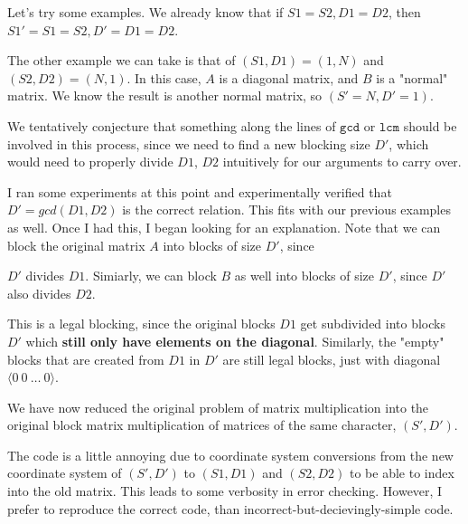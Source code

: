 \documentclass[11pt]{article}
\begin{document}
Let's try some examples. We already know that if $S1 = S2, D1 = D2$, then
$S1' = S1 = S2, D' = D1 = D2$.


The other example we can take is that of $(S1, D1) = (1, N)$ and $(S2, D2) =
(N, 1)$. In this case, $A$ is a diagonal matrix, and $B$ is a "normal" matrix.
We know the result is another normal matrix, so $(S' = N, D' = 1)$.


We tentatively conjecture that something along the lines of $\texttt{gcd}$
or $\texttt{lcm}$ should be involved in this process, since we need to find
a new blocking size $D'$, which would need to properly divide $D1$, $D2$ 
intuitively for our arguments to carry over. 


I ran some experiments at this point and experimentally verified that 
$D' = gcd(D1, D2)$ is the correct relation. This fits with our previous
examples as well. Once I had this, I began looking for an explanation.
Note that we can block the original matrix $A$ into blocks of size $D'$, since

$D'$ divides $D1$.  Simiarly, we can block $B$ as well into blocks of size
$D'$, since $D'$ also divides $D2$.

This is a legal blocking, since the original blocks $D1$ get subdivided into
blocks $D'$ which \textbf{still only have elements on the diagonal}. Similarly,
the "empty" blocks that are created from $D1$ in $D'$ are still legal blocks,
just with diagonal $\langle 0~0~\dots~0 \rangle$.


We have now reduced the original problem of matrix multiplication into the
original block matrix multiplication of matrices of the same character, $(S', D')$.


\newpage
The code is a little annoying due to coordinate system conversions from the
new coordinate system of $(S', D')$ to $(S1, D1)$ and $(S2, D2)$ to be able
to index into the old matrix. This leads to some verbosity in error checking.
However, I prefer to reproduce the correct code, than 
incorrect-but-decievingly-simple code.
\end{document}
